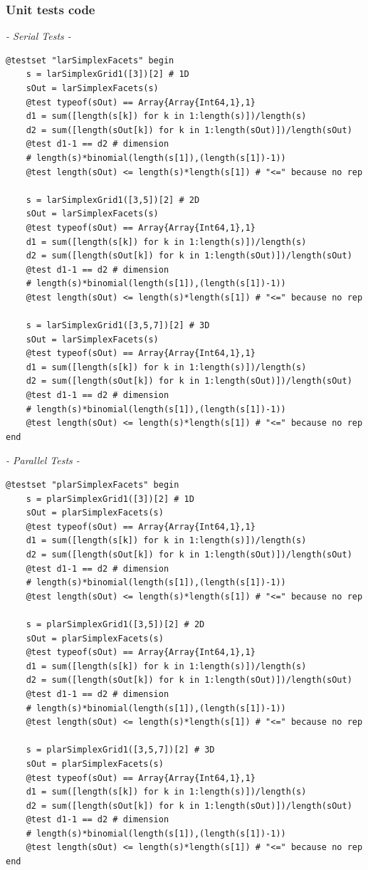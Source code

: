 \documentclass[a4paper,12pt,titlepage]{article}					%
\begin{document}
\subsubsection{Unit tests code}
\emph{- Serial Tests -}

\begin{Verbatim}
@testset "larSimplexFacets" begin
	s = larSimplexGrid1([3])[2] # 1D
	sOut = larSimplexFacets(s)
	@test typeof(sOut) == Array{Array{Int64,1},1}
	d1 = sum([length(s[k]) for k in 1:length(s)])/length(s)
	d2 = sum([length(sOut[k]) for k in 1:length(sOut)])/length(sOut)
	@test d1-1 == d2 # dimension
	# length(s)*binomial(length(s[1]),(length(s[1])-1))
	@test length(sOut) <= length(s)*length(s[1]) # "<=" because no rep
	
	s = larSimplexGrid1([3,5])[2] # 2D
	sOut = larSimplexFacets(s)
	@test typeof(sOut) == Array{Array{Int64,1},1}
	d1 = sum([length(s[k]) for k in 1:length(s)])/length(s)
	d2 = sum([length(sOut[k]) for k in 1:length(sOut)])/length(sOut)
	@test d1-1 == d2 # dimension
	# length(s)*binomial(length(s[1]),(length(s[1])-1))
	@test length(sOut) <= length(s)*length(s[1]) # "<=" because no rep
	
	s = larSimplexGrid1([3,5,7])[2] # 3D
	sOut = larSimplexFacets(s)
	@test typeof(sOut) == Array{Array{Int64,1},1}
	d1 = sum([length(s[k]) for k in 1:length(s)])/length(s)
	d2 = sum([length(sOut[k]) for k in 1:length(sOut)])/length(sOut)
	@test d1-1 == d2 # dimension
	# length(s)*binomial(length(s[1]),(length(s[1])-1))
	@test length(sOut) <= length(s)*length(s[1]) # "<=" because no rep
end
\end{Verbatim}

\emph{- Parallel Tests -}

\begin{Verbatim}
@testset "plarSimplexFacets" begin
	s = plarSimplexGrid1([3])[2] # 1D
	sOut = plarSimplexFacets(s)
	@test typeof(sOut) == Array{Array{Int64,1},1}
	d1 = sum([length(s[k]) for k in 1:length(s)])/length(s)
	d2 = sum([length(sOut[k]) for k in 1:length(sOut)])/length(sOut)
	@test d1-1 == d2 # dimension
	# length(s)*binomial(length(s[1]),(length(s[1])-1))
	@test length(sOut) <= length(s)*length(s[1]) # "<=" because no rep
	
	s = plarSimplexGrid1([3,5])[2] # 2D
	sOut = plarSimplexFacets(s)
	@test typeof(sOut) == Array{Array{Int64,1},1}
	d1 = sum([length(s[k]) for k in 1:length(s)])/length(s)
	d2 = sum([length(sOut[k]) for k in 1:length(sOut)])/length(sOut)
	@test d1-1 == d2 # dimension
	# length(s)*binomial(length(s[1]),(length(s[1])-1))
	@test length(sOut) <= length(s)*length(s[1]) # "<=" because no rep
	
	s = plarSimplexGrid1([3,5,7])[2] # 3D
	sOut = plarSimplexFacets(s)
	@test typeof(sOut) == Array{Array{Int64,1},1}
	d1 = sum([length(s[k]) for k in 1:length(s)])/length(s)
	d2 = sum([length(sOut[k]) for k in 1:length(sOut)])/length(sOut)
	@test d1-1 == d2 # dimension
	# length(s)*binomial(length(s[1]),(length(s[1])-1))
	@test length(sOut) <= length(s)*length(s[1]) # "<=" because no rep
end
\end{Verbatim}
\end{document}
